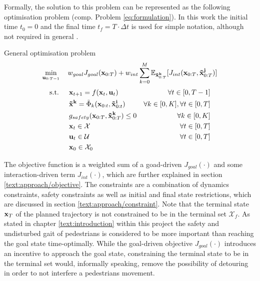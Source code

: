 Formally, the solution to this problem can be represented as the following optimisation problem (comp. Problem \ref{eq:formulation}). In this work the initial time $t_0 = 0$ and the final time $t_f = T \cdot \Delta t$ is used for simple notation, although not required in general \cite{Wachter2006}. \\

\begin{problem} General \project optimisation problem
\begin{equation}
\min_{\u_{0:T-1}} \quad w_{goal} J_{goal}(\x_{0:T}) + w_{int} \sum_{k=0}^M \mathbb{E}_{\xped[k]_{0:T}}[J_{int}(\x_{0:T}, \xped[j]_{0:T})]
\end{equation}
\begin{align}
\textrm{s.t. } \quad & \x_{t+1} = f(\x_t, \u_t) & \forall t \in [0, T - 1] \\
& \xped[k] = \tilde{\Phi}_k(\x_{0:t}, \xped[i]_{0:t}) & \forall k \in [0, K], \forall t \in [0, T]\\
& g_{safety}(\x_{0:T}, \xped[k]_{0:T}) \leq 0 & \forall k \in [0, K] \\
& \x_t \in \mathcal{X} & \forall t \in [0, T]\\
& \u_t \in \mathcal{U} & \forall t \in [0, T]\\
& \x_0 \in \mathcal{X}_0
\end{align} 
\label{eq:formulation}
\end{problem}

The objective function is a weighted sum of a goad-driven $J_{goal}(\cdot)$ and some interaction-driven term $J_{int}(\cdot)$, which are further explained in section \ref{text:approach/objective}. The constraints are a combination of dynamics constraints, safety constraints as well as initial and final state restrictions, which are discussed in section \ref{text:approach/constraint}. Note that the terminal state $\mathbf{x}_T$ of the planned trajectory is not constrained to be in the terminal set $\mathcal{X}_f$. As stated in chapter \ref{text:introduction} within this project the safety and undisturbed gait of pedestrians is considered to be more important than reaching the goal state time-optimally. While the goal-driven objective $J_{goal}(\cdot)$ introduces an incentive to approach the goal state, constraining the terminal state to be in the terminal set would, informally speaking, remove the possibility of detouring in order to not interfere a pedestrians movement. 


